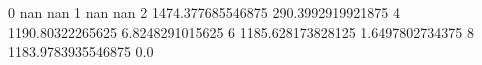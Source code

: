 0 nan nan
1 nan nan
2 1474.377685546875 290.3992919921875
4 1190.80322265625 6.8248291015625
6 1185.628173828125 1.6497802734375
8 1183.9783935546875 0.0
